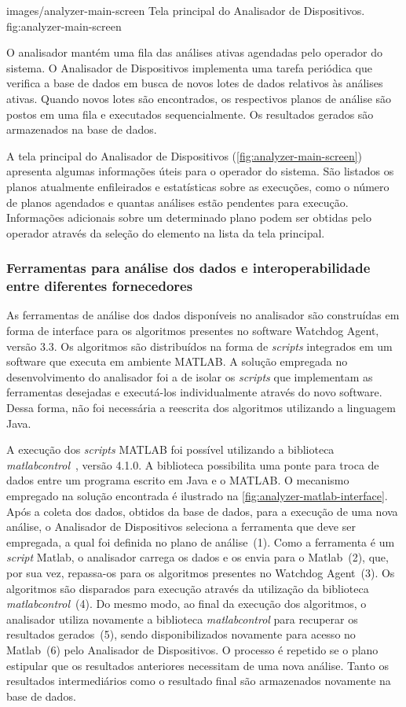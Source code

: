   {images/analyzer-main-screen}
  {Tela principal do Analisador de Dispositivos.}
  {fig:analyzer-main-screen}

O analisador mantém uma fila das análises ativas agendadas pelo operador do sistema. O Analisador de
Dispositivos implementa uma tarefa periódica que verifica a base de dados em busca de novos lotes de
dados relativos às análises ativas. Quando novos lotes são encontrados, os respectivos planos de
análise são postos em uma fila e executados sequencialmente. Os resultados gerados são armazenados
na base de dados.

A tela principal do Analisador de Dispositivos (\cref{fig:analyzer-main-screen}) apresenta algumas
informações úteis para o operador do sistema. São listados os planos atualmente enfileirados e
estatísticas sobre as execuções, como o número de planos agendados e quantas análises estão
pendentes para execução. Informações adicionais sobre um determinado plano podem ser obtidas pelo
operador através da seleção do elemento na lista da tela principal.


\subsubsection{Ferramentas para análise dos dados e interoperabilidade entre diferentes
    fornecedores}

As ferramentas de análise dos dados disponíveis no analisador são construídas em forma de interface
para os algoritmos presentes no software Watchdog Agent, versão 3.3. Os algoritmos
são distribuídos na forma de \textit{scripts} integrados em um software que executa em ambiente
MATLAB. A solução empregada no desenvolvimento do analisador foi a de isolar os \textit{scripts} que
implementam as ferramentas desejadas e executá-los individualmente através do novo software. Dessa
forma, não foi necessária a reescrita dos algoritmos utilizando a linguagem Java.

A execução dos \textit{scripts} MATLAB foi possível utilizando a biblioteca
\emph{matlabcontrol}~\cite{matlabcontrol2013homepage}, versão 4.1.0. A biblioteca possibilita uma
ponte para troca de dados entre um programa escrito em Java e o MATLAB. O mecanismo empregado na
solução encontrada é ilustrado na \cref{fig:analyzer-matlab-interface}. Após a coleta dos dados,
obtidos da base de dados, para a execução de uma nova análise, o Analisador de Dispositivos
seleciona a ferramenta que deve ser empregada, a qual foi definida no plano de análise~(1). Como a
ferramenta é um \textit{script} Matlab, o analisador carrega os dados e os envia para o Matlab~(2),
que, por sua vez, repassa-os para os algoritmos presentes no Watchdog Agent~(3). Os algoritmos são
disparados para execução através da utilização da biblioteca \emph{matlabcontrol}~(4). Do mesmo
modo, ao final da execução dos algoritmos, o analisador utiliza novamente a biblioteca
\emph{matlabcontrol} para recuperar os resultados gerados~(5), sendo disponibilizados novamente para
acesso no Matlab~(6) pelo Analisador de Dispositivos. O processo é repetido se o plano estipular que
os resultados anteriores necessitam de uma nova análise. Tanto os resultados intermediários como o
resultado final são armazenados novamente na base de dados.

